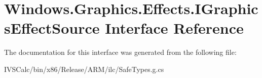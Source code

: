 \hypertarget{interface_windows_1_1_graphics_1_1_effects_1_1_i_graphics_effect_source}{}\section{Windows.\+Graphics.\+Effects.\+I\+Graphics\+Effect\+Source Interface Reference}
\label{interface_windows_1_1_graphics_1_1_effects_1_1_i_graphics_effect_source}


The documentation for this interface was generated from the following file\+:\begin{DoxyCompactItemize}
\item 
I\+V\+S\+Calc/bin/x86/\+Release/\+A\+R\+M/ilc/Safe\+Types.\+g.\+cs\end{DoxyCompactItemize}
